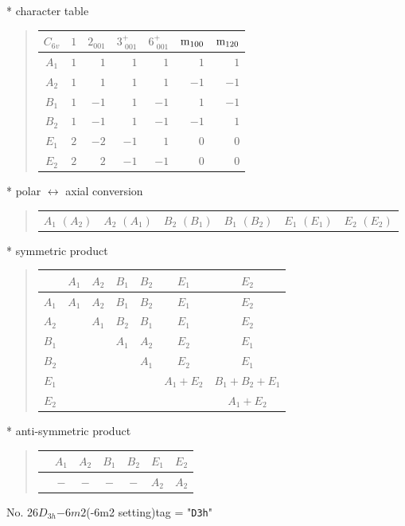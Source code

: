 \documentclass[fleqn,10pt,landscape]{jsarticle}
\begin{document}
* character table
\begin{quote}
\begin{tabular}{crrrrrr} \hline \hline
$ C_{6v} $ & $ 1 $ & $ 2{}_{001} $ & $ 3^{+}_{\,\,001} $ & $ 6^{+}_{\,\,001} $ & $ {\rm m}_{100} $ & $ {\rm m}_{120} $ \\ \hline
$ A_{1} $ & $ 1 $ & $ 1 $ & $ 1 $ & $ 1 $ & $ 1 $ & $ 1 $ \\
$ A_{2} $ & $ 1 $ & $ 1 $ & $ 1 $ & $ 1 $ & $ -1 $ & $ -1 $ \\
$ B_{1} $ & $ 1 $ & $ -1 $ & $ 1 $ & $ -1 $ & $ 1 $ & $ -1 $ \\
$ B_{2} $ & $ 1 $ & $ -1 $ & $ 1 $ & $ -1 $ & $ -1 $ & $ 1 $ \\
$ E_{1} $ & $ 2 $ & $ -2 $ & $ -1 $ & $ 1 $ & $ 0 $ & $ 0 $ \\
$ E_{2} $ & $ 2 $ & $ 2 $ & $ -1 $ & $ -1 $ & $ 0 $ & $ 0 $ \\
 \hline \hline
\end{tabular}
\end{quote}
* polar $\leftrightarrow$ axial conversion
\begin{quote}
\begin{tabular}{cccccc}
$ A_{1}\,\,(A_{2}) $ & $ A_{2}\,\,(A_{1}) $ & $ B_{2}\,\,(B_{1}) $ & $ B_{1}\,\,(B_{2}) $ & $ E_{1}\,\,(E_{1}) $ & $ E_{2}\,\,(E_{2}) $
\end{tabular}
\end{quote}
* symmetric product
\begin{quote}
\begin{tabular}{c|cccccc} \hline \hline
 & $ A_{1} $ & $ A_{2} $ & $ B_{1} $ & $ B_{2} $ & $ E_{1} $ & $ E_{2} $ \\ \hline
$ A_{1} $ & $ A_{1} $ & $ A_{2} $ & $ B_{1} $ & $ B_{2} $ & $ E_{1} $ & $ E_{2} $ \\
$ A_{2} $ & $  $ & $ A_{1} $ & $ B_{2} $ & $ B_{1} $ & $ E_{1} $ & $ E_{2} $ \\
$ B_{1} $ & $  $ & $  $ & $ A_{1} $ & $ A_{2} $ & $ E_{2} $ & $ E_{1} $ \\
$ B_{2} $ & $  $ & $  $ & $  $ & $ A_{1} $ & $ E_{2} $ & $ E_{1} $ \\
$ E_{1} $ & $  $ & $  $ & $  $ & $  $ & $ A_{1} + E_{2} $ & $ B_{1} + B_{2} + E_{1} $ \\
$ E_{2} $ & $  $ & $  $ & $  $ & $  $ & $  $ & $ A_{1} + E_{2} $ \\
 \hline \hline
\end{tabular}
\end{quote}
* anti-symmetric product
\begin{quote}
\begin{tabular}{ccccccc} \hline \hline
 & $ A_{1} $ & $ A_{2} $ & $ B_{1} $ & $ B_{2} $ & $ E_{1} $ & $ E_{2} $ \\ \hline
$  $ & $ - $ & $ - $ & $ - $ & $ - $ & $ A_{2} $ & $ A_{2} $ \\
 \hline \hline
\end{tabular}
\end{quote}
\newpage
No. 26\quad$D_{3h}$\quad$-6m2$\quad(-6m2 setting)\quad[ hexagonal ]
tag = "{\tt D3h}"
\end{document}
